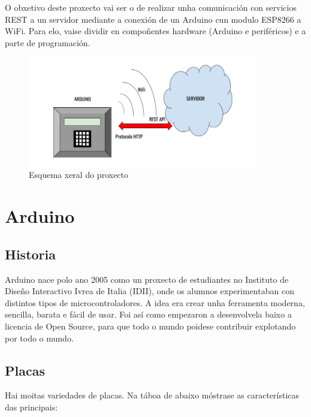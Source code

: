 \documentclass[11pt,twoside]{book}
\begin{document}
O obxetivo deste proxecto vai ser o de realizar unha comunicación con servicios REST a un servidor mediante a conexión de un Arduino cun modulo ESP8266 a WiFi. Para elo, vaise dividir en compoñentes hardware (Arduino e periféricos) e a parte de programación.

\begin{figure}[H]
	\begin{center}
		\includegraphics[width=10cm]{images/esquema_xeral.png}
	\end{center}
	\caption{Esquema xeral do proxecto}
	\label{fig:IoT}
\end{figure}



\chapter{Arduino}

\section{Historia}

Arduino nace polo ano 2005 como un proxecto de estudiantes no Instituto de Diseño Interactivo Ivrea de Italia (IDII), onde os alumnos experimentaban con distintos tipos de microcontroladores. A idea era crear unha ferramenta moderna, sencilla, barata e fácil de usar. Foi así como empezaron a desenvolvela baixo a licencia de Open Source, para que todo o mundo poidese contribuir explotando por todo o mundo.

\section{Placas}

Hai moitas variedades de placas. Na táboa de abaixo móstrase as características das principais:
\end{document}
